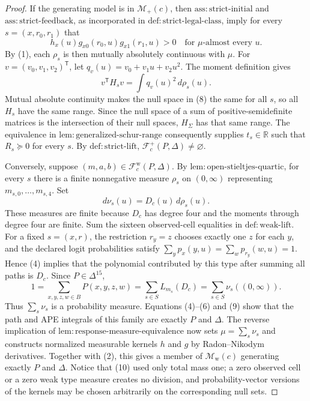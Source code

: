 \documentclass{article}
\begin{document}
\begin{proof}
If the generating model is in \(\mathcal M_+(c)\), then \(\mathrm{ass{:}strict\text{-}initial}\) and \(\mathrm{ass{:}strict\text{-}feedback}\), as incorporated in \(\mathrm{def{:}strict\text{-}legal\text{-}class}\), imply for every \(s=(x,r_0,r_1)\) that
\[
 h_x(u)g_{x0}(r_0,u)g_{x1}(r_1,u)>0
 \quad\text{for }\mu\text{-almost every }u. \tag{7}
\]
By (1), each \(\rho_s\) is then mutually absolutely continuous with \(\mu\).  For \(v=(v_0,v_1,v_2)^{\mathsf T}\), let \(q_v(u)=v_0+v_1u+v_2u^2\).  The moment definition gives
\[
 v^{\mathsf T}H_sv=\int q_v(u)^2\,d\rho_s(u). \tag{8}
\]
Mutual absolute continuity makes the null space in (8) the same for all \(s\), so all \(H_s\) have the same range.  Since the null space of a sum of positive-semidefinite matrices is the intersection of their null spaces, \(H_\Sigma\) has that same range.  The equivalence in \(\mathrm{lem{:}generalized\text{-}schur\text{-}range}\) consequently supplies \(t_s\in\mathbb R\) such that \(R_s\succeq0\) for every \(s\).  By \(\mathrm{def{:}strict\text{-}lift}\), \(\mathcal F_c^+(P,\Delta)\ne\varnothing\).

Conversely, suppose \((m,a,b)\in\mathcal F_c^{\mathrm w}(P,\Delta)\).  By \(\mathrm{lem{:}open\text{-}stieltjes\text{-}quartic}\), for every \(s\) there is a finite nonnegative measure \(\rho_s\) on \((0,\infty)\) representing \(m_{s,0},\ldots,m_{s,4}\).  Set
\[
 d\nu_s(u)=D_c(u)\,d\rho_s(u). \tag{9}
\]
These measures are finite because \(D_c\) has degree four and the moments through degree four are finite.  Sum the sixteen observed-cell equalities in \(\mathrm{def{:}weak\text{-}lift}\).  For a fixed \(s=(x,r)\), the restriction \(r_y=z\) chooses exactly one \(z\) for each \(y\), and the declared logit probabilities satisfy \(\sum_y p_x(y,u)=\sum_w p_{r_y}(w,u)=1\).  Hence (4) implies that the polynomial contributed by this type after summing all paths is \(D_c\).  Since \(P\in\Delta^{15}\),
\[
 1=\sum_{x,y,z,w\in B}P(x,y,z,w)
 =\sum_{s\in S}L_{m_s}(D_c)
 =\sum_{s\in S}\nu_s((0,\infty)). \tag{10}
\]
Thus \(\sum_s\nu_s\) is a probability measure.  Equations (4)--(6) and (9) show that the path and APE integrals of this family are exactly \(P\) and \(\Delta\).  The reverse implication of \(\mathrm{lem{:}response\text{-}measure\text{-}equivalence}\) now sets \(\mu=\sum_s\nu_s\) and constructs normalized measurable kernels \(h\) and \(g\) by Radon--Nikodym derivatives.  Together with (2), this gives a member of \(\mathcal M_{\mathrm w}(c)\) generating exactly \(P\) and \(\Delta\).  Notice that (10) used only total mass one; a zero observed cell or a zero weak type measure creates no division, and probability-vector versions of the kernels may be chosen arbitrarily on the corresponding null sets.


\end{proof}
\end{document}
